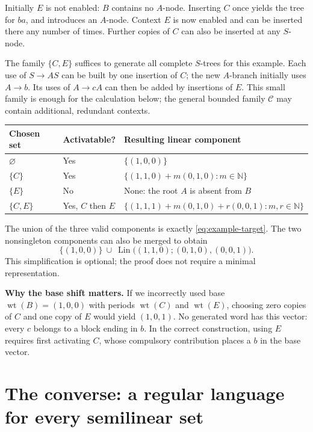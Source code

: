 \documentclass[11pt,a4paper]{article}
\numberwithin{equation}{section}
\theoremstyle{plain}
\theoremstyle{definition}
\theoremstyle{remark}
\newcommand{\N}{\mathbb N}
\newcommand{\wt}{\operatorname{wt}}
\newcommand{\Lin}{\operatorname{Lin}}
\newcommand{\Cycles}{\mathcal C}
\begin{document}
Initially $E$ is not enabled: $B$ contains no $A$-node. Inserting $C$ once yields the tree for $ba$, and introduces an $A$-node. Context $E$ is now enabled and can be inserted there any number of times. Further copies of $C$ can also be inserted at any $S$-node.

The family $\{C,E\}$ suffices to generate all complete $S$-trees for this example. Each use of $S\to AS$ can be built by one insertion of $C$; the new $A$-branch initially uses $A\to b$. Its uses of $A\to cA$ can then be added by insertions of $E$. This small family is enough for the calculation below; the general bounded family $\Cycles$ may contain additional, redundant contexts.

\begin{center}
\small
\begin{tabular}{@{}p{22mm}p{31mm}p{87mm}@{}}
\toprule
Chosen set & Activatable? & Resulting linear component\\
\midrule
$\varnothing$ & Yes & $\{(1,0,0)\}$\\[2pt]
$\{C\}$ & Yes & $\{(1,1,0)+m(0,1,0):m\in\N\}$\\[2pt]
$\{E\}$ & No & None: the root $A$ is absent from $B$\\[2pt]
$\{C,E\}$ & Yes, $C$ then $E$ & $\{(1,1,1)+m(0,1,0)+r(0,0,1):m,r\in\N\}$\\
\bottomrule
\end{tabular}
\end{center}

The union of the three valid components is exactly \eqref{eq:example-target}. The two nonsingleton components can also be merged to obtain
\[
\{(1,0,0)\}\ \cup\
\Lin\bigl((1,1,0);(0,1,0),(0,0,1)\bigr).
\]
This simplification is optional; the proof does not require a minimal representation.

\textbf{Why the base shift matters.}
If we incorrectly used base $\wt(B)=(1,0,0)$ with periods $\wt(C)$ and $\wt(E)$, choosing zero copies of $C$ and one copy of $E$ would yield $(1,0,1)$. No generated word has this vector: every $c$ belongs to a block ending in $b$. In the correct construction, using $E$ requires first activating $C$, whose compulsory contribution places a $b$ in the base vector.

\section{The converse: a regular language for every semilinear set}\label{sec:converse}
\end{document}
